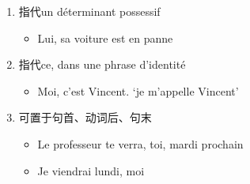 \documentclass[UTF8]{report}
\begin{document}
\begin{enumerate}
\begin{enumerate}
        \item 指代un déterminant possessif
        \begin{itemize}
            \item Lui, sa voiture est en panne
        \end{itemize}
        \item 指代ce, dans une phrase d’identité 
        \begin{itemize}
            \item Moi, c’est Vincent. ‘je m’appelle Vincent’
        \end{itemize}
        \item 可置于句首、动词后、句末
        \begin{itemize}
            \item Le professeur te verra, toi, mardi prochain
            \item Je viendrai lundi, moi
        \end{itemize}
    \end{enumerate}
\end{enumerate}
\end{document}
